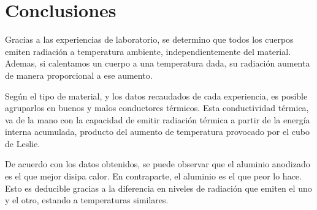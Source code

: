 \documentclass[a4paper,12pt]{report}
\begin{document}
\chapter{Conclusiones}
  Gracias a las experiencias de laboratorio, se determino que todos los cuerpos emiten radiación a temperatura ambiente,
  independientemente del material. Ademas, si calentamos un cuerpo a una temperatura dada, su radiación aumenta de
  manera proporcional a ese aumento.

  Según el tipo de material, y los datos recaudados de cada experiencia, es posible agruparlos en buenos y malos
  conductores térmicos. Esta conductividad térmica, va de la mano con la capacidad de emitir radiación térmica a partir
  de la energía interna acumulada, producto del aumento de temperatura provocado por el cubo de Leslie.

  De acuerdo con los datos obtenidos, se puede observar que el aluminio anodizado es el que mejor disipa calor. En
  contraparte, el aluminio es el que peor lo hace. Esto es deducible gracias a la diferencia en niveles de radiación
  que emiten el uno y el otro, estando a temperaturas similares.
\end{document}
